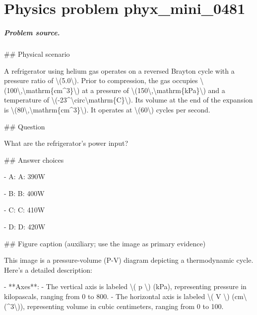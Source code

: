 
\chapter{Physics problem phyx\_mini\_0481}
\label{ch:PhyXMiniProblems_problem_phyx_mini_0481}

\paragraph{Problem source.}
\#\# Physical scenario

A refrigerator using helium gas operates on a reversed Brayton cycle with a pressure ratio of \textbackslash{}(5.0\textbackslash{}). Prior to compression, the gas occupies \textbackslash{}(100\textbackslash{},\textbackslash{}mathrm\{cm\textasciicircum{}3\}\textbackslash{}) at a pressure of \textbackslash{}(150\textbackslash{},\textbackslash{}mathrm\{kPa\}\textbackslash{}) and a temperature of \textbackslash{}(-23\textasciicircum{}\textbackslash{}circ\textbackslash{}mathrm\{C\}\textbackslash{}). Its volume at the end of the expansion is \textbackslash{}(80\textbackslash{},\textbackslash{}mathrm\{cm\textasciicircum{}3\}\textbackslash{}). It operates at \textbackslash{}(60\textbackslash{}) cycles per second.

\#\# Question

What are the refrigerator's power input?

\#\# Answer choices

- A: A: 390W

- B: B: 400W

- C: C: 410W

- D: D: 420W

\#\# Figure caption (auxiliary; use the image as primary evidence)

This image is a pressure-volume (P-V) diagram depicting a thermodynamic cycle. Here's a detailed description:

- **Axes**: 
  - The vertical axis is labeled \textbackslash{}( p \textbackslash{}) (kPa), representing pressure in kilopascals, ranging from 0 to 800.
  - The horizontal axis is labeled \textbackslash{}( V \textbackslash{}) (cm\textbackslash{}(\textasciicircum{}3\textbackslash{})), representing volume in cubic centimeters, ranging from 0 to 100.


